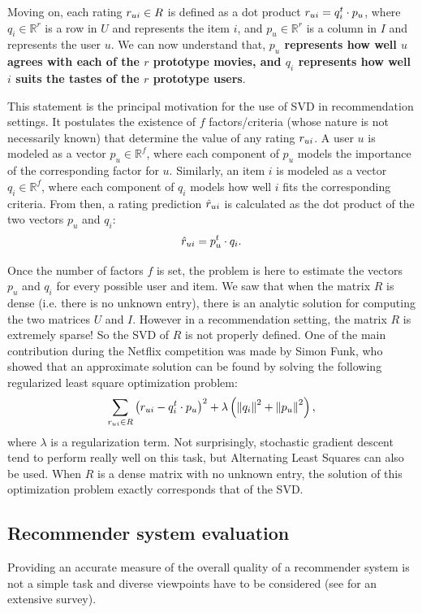 Moving on, each rating $r_{ui} \in R$ is defined as a dot product $r_{ui} = q_i^t
\cdot p_u$, where $q_i \in \mathbb{R}^r$ is a row in $U$ and represents the
item $i$, and $p_u \in \mathbb{R}^r$ is a column in $I$ and represents the user
$u$. We can now understand that, \textbf{$p_u$ represents how well $u$ agrees
with each of the $r$ prototype movies, and $q_i$ represents how well $i$ suits
the tastes of the $r$ prototype users}. 

This statement is the principal motivation for the use of SVD in recommendation
settings. It postulates the existence of $f$ factors/criteria (whose nature is
not necessarily known) that determine the value of any rating $r_{ui}$.  A user
$u$ is modeled as a vector $p_u \in \mathbb{R}^f$, where each component of
$p_u$ models the importance of the corresponding factor for $u$.  Similarly, an
item $i$ is modeled as a vector $q_i \in \mathbb{R}^f$, where each component of
$q_i$ models how well $i$ fits the corresponding criteria.  From then, a rating
prediction $\hat{r}_{ui}$ is calculated as the dot product of the two vectors $p_u$
and $q_i$:
$$\hat{r}_{ui} = p_u^t \cdot q_i.$$ 

Once the number of factors $f$ is set, the problem is here to estimate the
vectors $p_u$ and $q_i$ for every possible user and item. We saw that when the
matrix $R$ is dense (i.e. there is no unknown entry), there is an analytic
solution for computing the two matrices $U$ and $I$. However in a
recommendation setting, the matrix $R$ is extremely sparse! So the SVD of $R$
is not properly defined. One of the main contribution during the Netflix
competition was made by Simon Funk, who showed that an approximate solution can
be found by solving the following regularized least square optimization
problem:
$$
\sum_{r_{ui} \in R} \left(r_{ui} - q_i^t \cdot p_u \right)^2 +
\lambda\left({\left\lVert q_i\right\rVert}_{}^2 + {\left\lVert p_u\right\rVert}_{}^2\right),
$$
where $\lambda$ is a regularization term. Not surprisingly, stochastic gradient
descent tend to perform really well on this task, but Alternating Least Squares
can also be used. When $R$ is a dense matrix with no unknown entry, the
solution of this optimization problem exactly corresponds that of the SVD.


\subsection{Recommender system evaluation}
\label{SEC:Recommender_system_evaluation}
Providing an accurate measure of the overall quality of a recommender system is
not a simple task and diverse viewpoints have to be considered (see \cite[Ch.
??]{RecoSystemHandbook} for an extensive survey).

